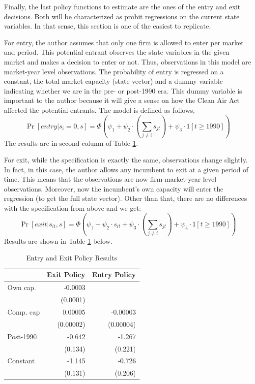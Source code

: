\documentclass[12pt]{article}
\newcommand{\Prob}[1]{\operatorname{Pr}\left[#1\right]}
\begin{document}
Finally, the last policy functions to estimate are the ones of the entry and exit decisions. Both will be characterized as probit regressions on the current state variables. In that sense, this section is one of the easiest to replicate.

For entry, the author assumes that only one firm is allowed to enter per market and period. This potential entrant observes the state variables in the given market and makes a decision to enter or not. Thus, observations in this model are market-year level observations. The probability of entry is regressed on a constant, the total market capacity (state vector) and a dummy variable indicating whether we are in the pre- or post-1990 era. This dummy variable is important to the author because it will give a sense on how the Clean Air Act affected the potential entrants. The model is defined as follows,
$$ \Prob{\textit{entry}|s_i =0, s} = \Phi\left(\psi_1 + \psi_2\cdot\left(\sum_{j\neq i} s_{jt}\right) + \psi_3\cdot 1[t \geq 1990]\right) $$
The results are in second column of Table \ref{tab:entryexit}.

For exit, while the specification is exactly the same, observations change slightly. In fact, in this case, the author allows any incumbent to exit at a given period of time. This means that the observations are now firm-market-year level observations. Moreover, now the incumbent's own capacity will enter the regression (to get the full state vector). Other than that, there are no differences with the specification from above and we get: $$ \Prob{\textit{exit}|s_{it}, s} = \Phi\left(\psi_1 + \psi_2\cdot s_{it} + \psi_3\cdot\left(\sum_{j\neq i} s_{jt}\right) + \psi_4\cdot 1[t \geq 1990]\right) $$
Results are shown in Table \ref{tab:entryexit} below.\\

\begin{table}[ht!]
\centering
\begin{tabular}{lrr}
\hline \hline
 & Exit Policy & Entry Policy \\ \hline
Own cap. & -0.0003 &  \\
 & (0.0001) &  \\
Comp. cap & 0.00005 & -0.00003 \\
 & (0.00002) & (0.00004) \\
Post-1990 & -0.642 & -1.267 \\
 & (0.134) & (0.221) \\
Constant & -1.145 & -0.726 \\
 & (0.131) & (0.206) \\ \hline \hline
\end{tabular}
\caption{Entry and Exit Policy Results}
\label{tab:entryexit}
\end{table}
\end{document}
